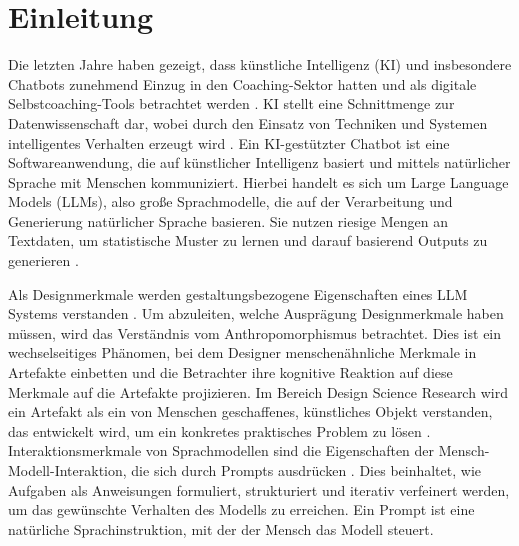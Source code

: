 \chapter{Einleitung} \label{chap:1}

Die letzten Jahre haben gezeigt, dass künstliche Intelligenz (KI) und insbesondere Chatbots
zunehmend Einzug in den Coaching-Sektor hatten und als digitale Selbstcoaching-Tools
betrachtet werden \citep{mai2023chatbots}. KI stellt eine Schnittmenge zur Datenwissenschaft dar, wobei durch den Einsatz von Techniken und Systemen intelligentes Verhalten erzeugt wird \citep{balzert2009software}. 
Ein KI-gestützter Chatbot ist eine Softwareanwendung, die auf künstlicher Intelligenz basiert und mittels natürlicher Sprache mit Menschen kommuniziert. 
Hierbei handelt es sich um Large Language Models (LLMs), also große Sprachmodelle, die auf der Verarbeitung und Generierung natürlicher Sprache basieren. Sie nutzen riesige Mengen an Textdaten, um statistische Muster zu lernen und
darauf basierend Outputs zu generieren \citep{Douglas2023Large}.

Als Designmerkmale werden gestaltungsbezogene Eigenschaften eines LLM Systems verstanden \citep{Xiao2025Humanizing}. Um abzuleiten, welche Ausprägung Designmerkmale haben müssen,
wird das Verständnis vom Anthropomorphismus betrachtet. Dies ist ein wechselseitiges Phänomen, bei dem Designer menschenähnliche Merkmale in Artefakte einbetten und die Betrachter ihre kognitive Reaktion auf diese Merkmale auf die Artefakte projizieren. Im Bereich Design Science Research wird ein Artefakt als ein von Menschen geschaffenes, künstliches Objekt verstanden, das entwickelt wird, um ein konkretes praktisches Problem zu lösen \citep{hevner2004design}. Interaktionsmerkmale von Sprachmodellen sind die Eigenschaften der Mensch-Modell-Interaktion, die sich durch Prompts ausdrücken \citep{Gao2023Prompt}. Dies beinhaltet, wie Aufgaben als Anweisungen formuliert, strukturiert und iterativ verfeinert werden, um das gewünschte Verhalten des Modells zu erreichen. Ein Prompt ist eine natürliche Sprachinstruktion, mit der der Mensch das Modell steuert. 

